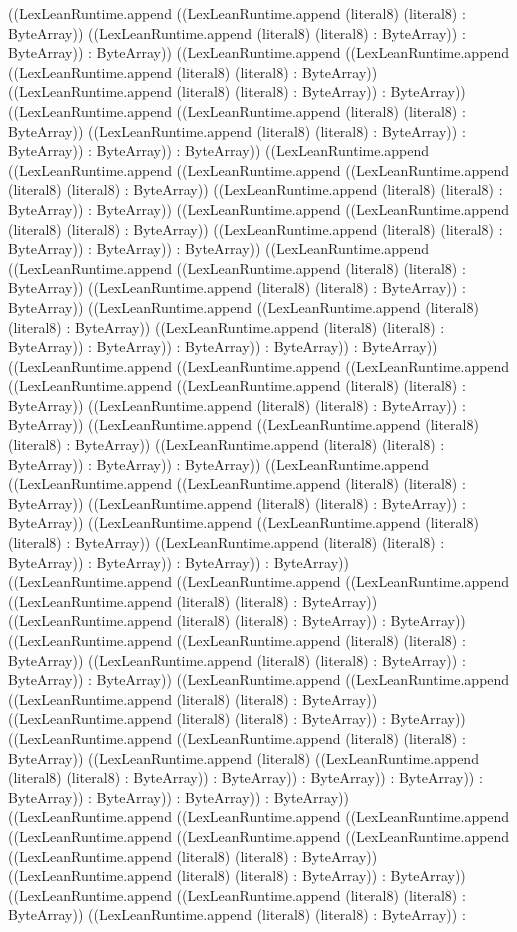 \documentclass[11pt]{article}
\begin{document}
((LexLeanRuntime.append ((LexLeanRuntime.append (literal8) (literal8) : ByteArray)) ((LexLeanRuntime.append (literal8) (literal8) : ByteArray)) : ByteArray)) : ByteArray)) ((LexLeanRuntime.append ((LexLeanRuntime.append ((LexLeanRuntime.append (literal8) (literal8) : ByteArray)) ((LexLeanRuntime.append (literal8) (literal8) : ByteArray)) : ByteArray)) ((LexLeanRuntime.append ((LexLeanRuntime.append (literal8) (literal8) : ByteArray)) ((LexLeanRuntime.append (literal8) (literal8) : ByteArray)) : ByteArray)) : ByteArray)) : ByteArray)) ((LexLeanRuntime.append ((LexLeanRuntime.append ((LexLeanRuntime.append ((LexLeanRuntime.append (literal8) (literal8) : ByteArray)) ((LexLeanRuntime.append (literal8) (literal8) : ByteArray)) : ByteArray)) ((LexLeanRuntime.append ((LexLeanRuntime.append (literal8) (literal8) : ByteArray)) ((LexLeanRuntime.append (literal8) (literal8) : ByteArray)) : ByteArray)) : ByteArray)) ((LexLeanRuntime.append ((LexLeanRuntime.append ((LexLeanRuntime.append (literal8) (literal8) : ByteArray)) ((LexLeanRuntime.append (literal8) (literal8) : ByteArray)) : ByteArray)) ((LexLeanRuntime.append ((LexLeanRuntime.append (literal8) (literal8) : ByteArray)) ((LexLeanRuntime.append (literal8) (literal8) : ByteArray)) : ByteArray)) : ByteArray)) : ByteArray)) : ByteArray)) ((LexLeanRuntime.append ((LexLeanRuntime.append ((LexLeanRuntime.append ((LexLeanRuntime.append ((LexLeanRuntime.append (literal8) (literal8) : ByteArray)) ((LexLeanRuntime.append (literal8) (literal8) : ByteArray)) : ByteArray)) ((LexLeanRuntime.append ((LexLeanRuntime.append (literal8) (literal8) : ByteArray)) ((LexLeanRuntime.append (literal8) (literal8) : ByteArray)) : ByteArray)) : ByteArray)) ((LexLeanRuntime.append ((LexLeanRuntime.append ((LexLeanRuntime.append (literal8) (literal8) : ByteArray)) ((LexLeanRuntime.append (literal8) (literal8) : ByteArray)) : ByteArray)) ((LexLeanRuntime.append ((LexLeanRuntime.append (literal8) (literal8) : ByteArray)) ((LexLeanRuntime.append (literal8) (literal8) : ByteArray)) : ByteArray)) : ByteArray)) : ByteArray)) ((LexLeanRuntime.append ((LexLeanRuntime.append ((LexLeanRuntime.append ((LexLeanRuntime.append (literal8) (literal8) : ByteArray)) ((LexLeanRuntime.append (literal8) (literal8) : ByteArray)) : ByteArray)) ((LexLeanRuntime.append ((LexLeanRuntime.append (literal8) (literal8) : ByteArray)) ((LexLeanRuntime.append (literal8) (literal8) : ByteArray)) : ByteArray)) : ByteArray)) ((LexLeanRuntime.append ((LexLeanRuntime.append ((LexLeanRuntime.append (literal8) (literal8) : ByteArray)) ((LexLeanRuntime.append (literal8) (literal8) : ByteArray)) : ByteArray)) ((LexLeanRuntime.append ((LexLeanRuntime.append (literal8) (literal8) : ByteArray)) ((LexLeanRuntime.append (literal8) ((LexLeanRuntime.append (literal8) (literal8) : ByteArray)) : ByteArray)) : ByteArray)) : ByteArray)) : ByteArray)) : ByteArray)) : ByteArray)) : ByteArray)) ((LexLeanRuntime.append ((LexLeanRuntime.append ((LexLeanRuntime.append ((LexLeanRuntime.append ((LexLeanRuntime.append ((LexLeanRuntime.append ((LexLeanRuntime.append (literal8) (literal8) : ByteArray)) ((LexLeanRuntime.append (literal8) (literal8) : ByteArray)) : ByteArray)) ((LexLeanRuntime.append ((LexLeanRuntime.append (literal8) (literal8) : ByteArray)) ((LexLeanRuntime.append (literal8) (literal8) : ByteArray)) : 
\end{document}
